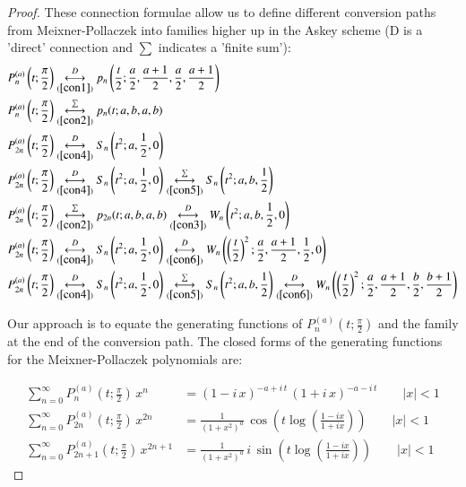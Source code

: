 \documentclass[a4paper,11pt,twoside]{amsart}
\newcommand{\verifiedeq}{=}
\newcommand{\verifiedeq}{\stackrel{\checkmark}{=}}
\begin{document}
\begin{proof}
These connection formulae allow us to define different conversion paths from Meixner-Pollaczek into families higher up in the Askey scheme (D is a 'direct' connection and $\sum$ indicates a 'finite sum'):
\begin{align}
P_{n}^{(a)}\left(t;\frac{\pi}{2}\right) &\overset{D}{\underset{(\ref{con1})}{\longleftrightarrow}} p_n\left(\frac{t}{2};\frac{a}{2},\frac{a+1}{2},\frac{a}{2},\frac{a+1}{2}\right) \label{path1}\\
P_{n}^{(a)}\left(t;\frac{\pi}{2}\right) &\overset{\sum}{\underset{(\ref{con2})}{\longleftrightarrow}} p_n(t;a,b,a,b)\label{path2} \\
P_{2n}^{(a)}\left(t;\frac{\pi}{2}\right) &\overset{D}{\underset{(\ref{con4})}{\longleftrightarrow}} S_n\left(t^2;a,\frac12,0\right) \label{path3}\\
P_{2n}^{(a)}\left(t;\frac{\pi}{2}\right) &\overset{D}{\underset{(\ref{con4})}{\longleftrightarrow}} S_n\left(t^2;a,\frac12,0\right) \overset{\sum}{\underset{(\ref{con5})}{\longleftrightarrow}} S_n\left(t^2;a,b,\frac12\right) \label{path4}\\
P_{2n}^{(a)}\left(t;\frac{\pi}{2}\right) &\overset{\sum}{\underset{(\ref{con2})}{\longleftrightarrow}} p_{2n}(t;a,b,a,b)  \overset{D}{\underset{(\ref{con3})}{\longleftrightarrow}} W_n\left(t^2;a,b,\frac12,0\right) \label{path5} \\
P_{2n}^{(a)}\left(t;\frac{\pi}{2}\right) &\overset{D}{\underset{(\ref{con4})}{\longleftrightarrow}} S_n\left(t^2;a,\frac12,0\right) \overset{D}{\underset{(\ref{con6})}{\longleftrightarrow}} W_n\left(\left(\frac{t}{2}\right)^2;\frac{a}{2},\frac{a+1}{2},\frac12,0\right)\label{path6}\\
P_{2n}^{(a)}\left(t;\frac{\pi}{2}\right) &\overset{D}{\underset{(\ref{con4})}{\longleftrightarrow}} S_n\left(t^2;a,\frac12,0\right) \overset{\sum}{\underset{(\ref{con5})}{\longleftrightarrow}} S_n\left(t^2;a,b,\frac12\right) \overset{D}{\underset{(\ref{con6})}{\longleftrightarrow}} W_n\left(\left(\frac{t}{2}\right)^2;\frac{a}{2},\frac{a+1}{2},\frac{b}{2},\frac{b+1}{2}\right) \label{path7}
\end{align}

Our approach is to equate the generating functions of $P_{n}^{(a)}\left(t;\frac{\pi}{2}\right)$ and the family at the end of the conversion path. The closed forms of the generating functions for the Meixner-Pollaczek polynomials are: 

\begin{align}
\sum_{n=0}^\infty P_n^{(a)}\left(t;\frac{\pi}{2}\right)\,x^n &\verifiedeq (1-i\,x)^{-a+i\,t}\,(1+i\,x)^{-a-i\,t} \qquad |x| < 1 \\
\sum_{n=0}^\infty P_{2n}^{(a)}\left(t;\frac{\pi}{2}\right)\,x^{2n} &\verifiedeq \frac{1}{\left(1+x^2\right)^a}\, \cos\left(t\log\left(\frac{1-ix}{1+ix}\right)\right) \qquad |x| < 1 \\
\sum_{n=0}^\infty P_{2n+1}^{(a)}\left(t;\frac{\pi}{2}\right)\,x^{2n+1} &\verifiedeq \frac{1}{\left(1+x^2\right)^a}\,i\, \sin\left(t\log\left(\frac{1-ix}{1+ix}\right)\right) \qquad |x| < 1
\end{align}


\end{proof}
\end{document}
